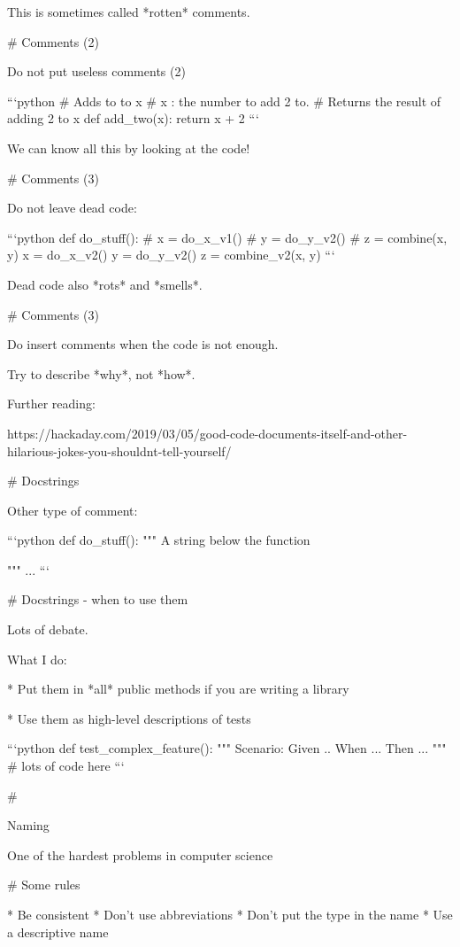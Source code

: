 \vfill

This is sometimes called *rotten* comments.

# Comments (2)

Do not put useless comments (2)

```python
# Adds to to x
# x : the number to add 2 to.
# Returns the result of adding 2 to x
def add_two(x):
    return x + 2
```

\vfill

We can know all this by looking at the code!

# Comments (3)

Do not leave dead code:

```python
def do_stuff():
    # x = do_x_v1()
    # y = do_y_v2()
    # z = combine(x, y)
    x = do_x_v2()
    y = do_y_v2()
    z = combine_v2(x, y)
```

Dead code also *rots* and *smells*.


# Comments (3)

Do insert comments when the code is not enough.

Try to describe *why*, not *how*.

Further reading:

https://hackaday.com/2019/03/05/good-code-documents-itself-and-other-hilarious-jokes-you-shouldnt-tell-yourself/

# Docstrings

Other type of comment:

```python
def do_stuff():
    """ A string below the function

    """
    ...
```

# Docstrings - when to use them

Lots of debate.

What I do:

* Put them in *all* public methods if you are writing a library

* Use them as high-level descriptions of tests

```python
def test_complex_feature():
    """ Scenario:
    Given ..
    When ...
    Then ...
    """
    # lots of code here
```

#

\huge \center Naming

\vfill

\normalsize One of the hardest problems in computer science

# Some rules

* Be consistent
* Don't use abbreviations
* Don't put the type in the name
* Use a descriptive name

